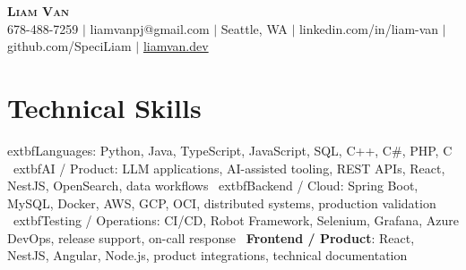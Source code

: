\documentclass[letterpaper,11pt]{article}
\begin{document}

%
\begin{center}
    \textbf{\Huge \scshape Liam Van} \\ \vspace{1pt}
    \small 678-488-7259 $|$ \small {liamvanpj@gmail.com} $|$ Seattle, WA
 {{$|$ linkedin.com/in/liam-van} {$|$ github.com/SpeciLiam} {$|$ \href{https://liamvan.dev}{liamvan.dev}}}

\end{center}

\section{Technical Skills}
 \begin{itemize}[leftmargin=0.15in, label={}]
    \small{\item{
     	extbf{Languages}{: Python, Java, TypeScript, JavaScript, SQL, C++, C\#, PHP, C} \
     	extbf{AI / Product}{: LLM applications, AI-assisted tooling, REST APIs, React, NestJS, OpenSearch, data workflows} \
     	extbf{Backend / Cloud}{: Spring Boot, MySQL, Docker, AWS, GCP, OCI, distributed systems, production validation} \
     	extbf{Testing / Operations}{: CI/CD, Robot Framework, Selenium, Grafana, Azure DevOps, release support, on-call response} \
     \textbf{Frontend / Product}{: React, NestJS, Angular, Node.js, product integrations, technical documentation} \\
    }}
 \end{itemize}
%

\end{document}

